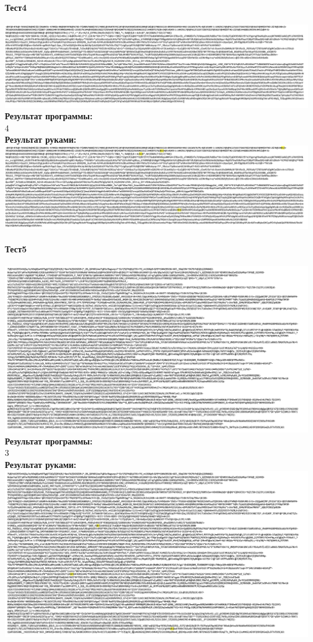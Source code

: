 \documentclass[12pt,onecolumn]{article}
\begin{document}
\begin{flushleft}
\paragraph{Тест4}
\hfill \break
\includegraphics[scale=0.4]{prog1/pt4.png}
\hfill \break
\textbf{Результат программы:}\\
4\\
\textbf{Результат руками:}
\hfill \break
\includegraphics[scale=0.4]{prog1/pt4+.png}
\paragraph{Тест5}
\hfill \break
\includegraphics[scale=0.4]{prog1/pt5.png}
\hfill \break
\textbf{Результат программы:}\\
3\\
\textbf{Результат руками:}
\hfill \break
\includegraphics[scale=0.4]{prog1/pt5+.png}

\end{flushleft}
\end{document}
